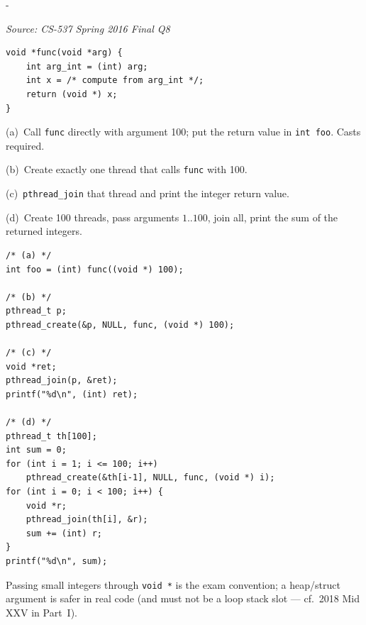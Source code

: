 \documentclass[11pt,a4paper]{article}
\makeatletter
\newcommand{\keepspace}[1]{\par\penalty-100\begingroup
  \setlength{\dimen@}{#1}\dimen@ii\pagegoal\advance\dimen@ii-\pagetotal
  \ifdim\dimen@>\dimen@ii\ifdim\dimen@ii>\z@\vfil\fi\break\fi\endgroup}
\newcounter{qn}[section]
\newenvironment{Qn}[4]{%
  \refstepcounter{qn}\keepspace{7\baselineskip}%
  \begin{tcolorbox}[qboxstyle, title={Q\thesection.\theqn\ \ [#1 \textbar\ #2]\ \ #4}]%
  {\footnotesize\color{g3}\textit{Source: #3}}\par\smallskip%
}{%
  \end{tcolorbox}%
}
\newenvironment{Sol}{%
  \begin{tcolorbox}[sboxstyle, title={Solution}]%
}{%
  \end{tcolorbox}\vspace{0.35em}%
}
\makeatother
\begin{document}
\begin{Qn}{Easy-Medium}{Lect 16}{CS-537 Spring 2016 Final Q8}{\texttt{pthread\_create} / \texttt{pthread\_join} with integer arguments}
\begin{lstlisting}[numbers=none]
void *func(void *arg) {
    int arg_int = (int) arg;
    int x = /* compute from arg_int */;
    return (void *) x;
}
\end{lstlisting}

(a)~Call \texttt{func} directly with argument 100; put the return value in \texttt{int foo}. Casts required.

(b)~Create exactly one thread that calls \texttt{func} with 100.

(c)~\texttt{pthread\_join} that thread and print the integer return value.

(d)~Create 100 threads, pass arguments $1..100$, join all, print the sum of the returned integers.
\end{Qn}
\begin{Sol}
\begin{lstlisting}[numbers=none]
/* (a) */
int foo = (int) func((void *) 100);

/* (b) */
pthread_t p;
pthread_create(&p, NULL, func, (void *) 100);

/* (c) */
void *ret;
pthread_join(p, &ret);
printf("%d\n", (int) ret);

/* (d) */
pthread_t th[100];
int sum = 0;
for (int i = 1; i <= 100; i++)
    pthread_create(&th[i-1], NULL, func, (void *) i);
for (int i = 0; i < 100; i++) {
    void *r;
    pthread_join(th[i], &r);
    sum += (int) r;
}
printf("%d\n", sum);
\end{lstlisting}

Passing small integers through \texttt{void *} is the exam convention; a heap/struct argument is safer in real code (and must not be a loop stack slot --- cf.\ 2018 Mid XXV in Part~I).
\end{Sol}
\end{document}

